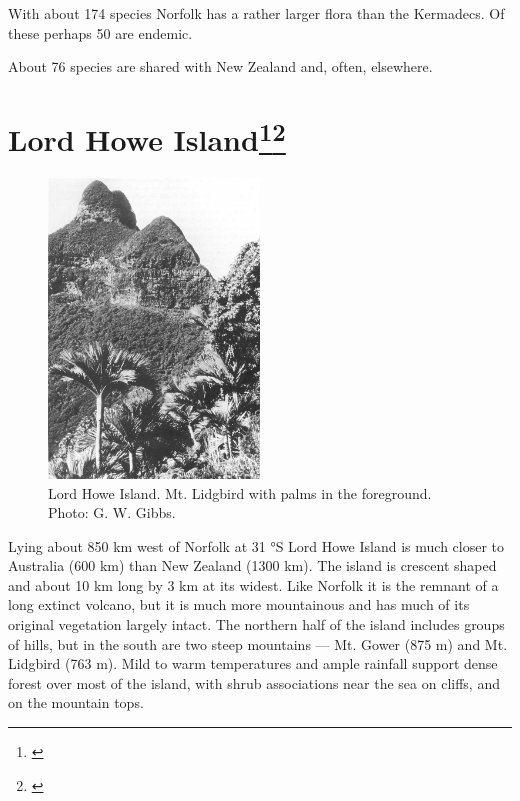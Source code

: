 With about 174 species Norfolk has a rather larger flora than the Kermadecs.
Of these perhaps 50 are endemic.

About 76 species are shared with New Zealand and, often, elsewhere.

\section[Lord Howe Island]{Lord Howe Island\footnote{\cite{oliver1896vegetation}}\footnote{\cite{green1979observations}}}

\begin{figure}
	\includegraphics[width=0.5\textwidth]{graphics/figure120lord-howe-island.jpg}
	\centering
	\caption[Lord Howe Island]{Lord Howe Island.
	Mt. Lidgbird with  palms in the foreground.
	Photo: G. W. Gibbs.}%
	\label{fig:120lord-howe-island}
\end{figure}

Lying about 850 km west of Norfolk at 31 °S Lord Howe Island is much closer to Australia (600 km) than New Zealand (1300 km).
The island is crescent shaped and about 10 km long by 3 km at its widest.
Like Norfolk it is the remnant of a long extinct volcano, but it is much more mountainous and has much of its original vegetation largely intact.
The northern half of the island includes groups of hills, but in the south are two steep mountains --- Mt.
Gower (875 m) and Mt.
Lidgbird (763 m).
Mild to warm temperatures and ample rainfall support dense forest over most of the island, with shrub associations near the sea on cliffs, and on the mountain tops.

